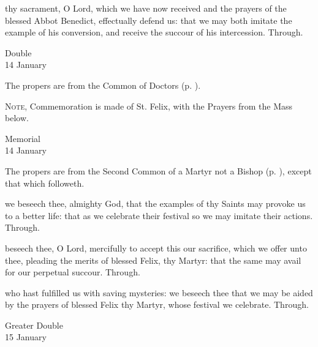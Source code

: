 \postcommunion
{} thy sacrament, O Lord, which we have now received and the prayers of the blessed Abbot Benedict, effectually defend us: that we may both imitate the example of his conversion, and receive the succour of his intercession. Through.


\begin{inhead}
    {Double\\
14 January}
\end{inhead}


\begin{rubric}
	The propers are from the Common of Doctors (p. \pageref{CommonDoctors}).\par
	\textsc{Note,} Commemoration is made of St. Felix, with the Prayers from the Mass below.
\end{rubric}


\begin{inhead}
    {Memorial\\
14 January}
\end{inhead}

\begin{rubric}
	The propers are from the Second Common of a Martyr not a Bishop (p. \pageref{CommonMartyrNotBishopII}), except that which followeth.\par
\end{rubric}

\collect
{} we beseech thee, almighty God, that the examples of thy Saints may provoke us to a better life: that as we celebrate their festival so we may imitate their actions. Through.

\secret
{} beseech thee, O Lord, mercifully to accept this our sacrifice, which we offer unto thee, pleading the merits of blessed Felix, thy Martyr: that the same may avail for our perpetual succour. Through.

\postcommunion
{} who hast fulfilled us with saving mysteries: we beseech thee that we may be aided by the prayers of blessed Felix thy Martyr, whose festival we celebrate. Through.



\begin{inhead}
    {Greater Double\\
15 January}
\end{inhead}

